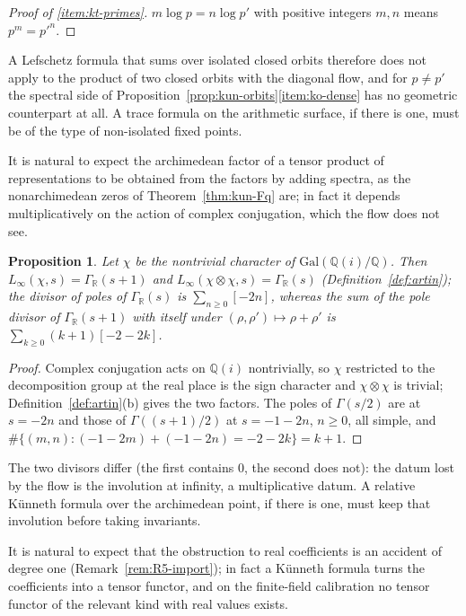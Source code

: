 \documentclass[11pt]{amsart}
\theoremstyle{plain}
\newtheorem{proposition}[theorem]{Proposition}
\theoremstyle{definition}
\theoremstyle{remark}
\numberwithin{equation}{section}
\newcommand{\Q}{\mathbb{Q}}
\newcommand{\GR}{\Gamma_{\mathbb{R}}}
\begin{document}
\begin{proof}[Proof of \ref{item:kt-primes}]
$m\log p=n\log p'$ with positive integers $m,n$ means $p^m=p'^n$.
\end{proof}

A Lefschetz formula that sums over isolated closed orbits therefore
does not apply to the product of two closed orbits with the diagonal
flow, and for $p\ne p'$ the spectral side of
Proposition~\ref{prop:kun-orbits}\ref{item:ko-dense} has no geometric
counterpart at all. A trace formula on the arithmetic surface, if there
is one, must be of the type of non-isolated fixed points.

It is natural to expect the archimedean factor of a tensor product of
representations to be obtained from the factors by adding spectra, as
the nonarchimedean zeros of Theorem~\ref{thm:kun-Fq} are; in fact it
depends multiplicatively on the action of complex conjugation, which
the flow does not see.

\begin{proposition}\label{prop:kun-arch}
Let $\chi$ be the nontrivial character of $\mathrm{Gal}(\Q(i)/\Q)$.
Then $L_\infty(\chi,s)=\GR(s+1)$ and
$L_\infty(\chi\otimes\chi,s)=\GR(s)$ (Definition~\ref{def:artin}); the
divisor of poles of $\GR(s)$ is $\sum_{n\ge0}[-2n]$, whereas the sum of
the pole divisor of $\GR(s+1)$ with itself under
$(\rho,\rho')\mapsto\rho+\rho'$ is $\sum_{k\ge0}(k+1)[-2-2k]$.
\end{proposition}

\begin{proof}
Complex conjugation acts on $\Q(i)$ nontrivially, so $\chi$ restricted
to the decomposition group at the real place is the sign character and
$\chi\otimes\chi$ is trivial; Definition~\ref{def:artin}(b) gives the
two factors. The poles of $\Gamma(s/2)$ are at $s=-2n$ and those of
$\Gamma((s+1)/2)$ at $s=-1-2n$, $n\ge0$, all simple, and
$\#\{(m,n):(-1-2m)+(-1-2n)=-2-2k\}=k+1$.
\end{proof}

The two divisors differ (the first contains $0$, the second does not):
the datum lost by the flow is the involution at infinity, a
multiplicative datum. A relative K\"unneth formula over the archimedean
point, if there is one, must keep that involution before taking
invariants.

It is natural to expect that the obstruction to real coefficients is an
accident of degree one (Remark~\ref{rem:R5-import}); in fact a K\"unneth
formula turns the coefficients into a tensor functor, and on the
finite-field calibration no tensor functor of the relevant kind with
real values exists.
\end{document}
